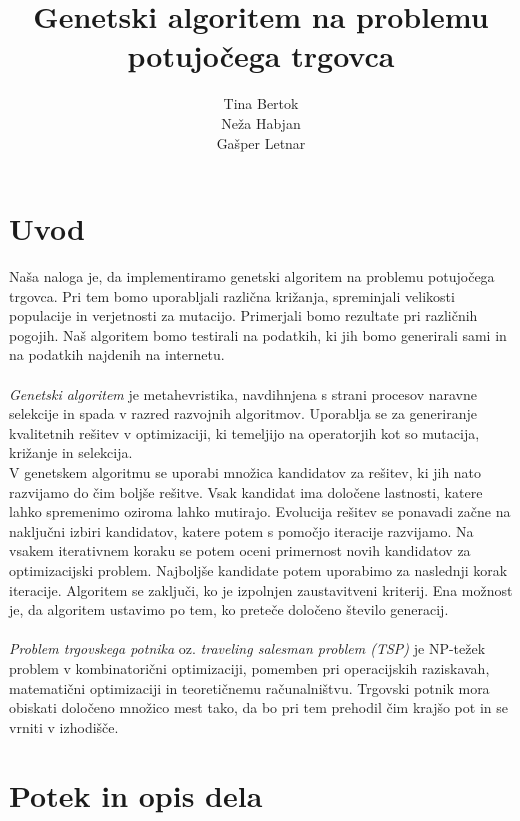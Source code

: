 \documentclass[a4paper]{article}
\title{Genetski algoritem na problemu potujočega trgovca}
\author{Tina Bertok\\ Neža Habjan \\ Gašper Letnar}
\begin{document}
\maketitle
\newpage

\section{Uvod}

Naša naloga je, da implementiramo genetski algoritem na problemu potujočega trgovca. Pri tem bomo uporabljali različna križanja, spreminjali velikosti populacije in verjetnosti za mutacijo. Primerjali bomo rezultate pri različnih pogojih. Naš algoritem bomo testirali na podatkih, ki jih bomo generirali sami in na podatkih najdenih na internetu. 
\\
\\
\textit{Genetski algoritem} je metahevristika, navdihnjena s strani procesov naravne selekcije in spada v razred razvojnih
algoritmov. Uporablja se za generiranje kvalitetnih rešitev v optimizaciji, ki temeljijo na operatorjih kot so mutacija, križanje
in selekcija.  
\\
V genetskem algoritmu se uporabi množica kandidatov za rešitev, ki jih nato razvijamo do čim boljše rešitve. Vsak kandidat
ima določene lastnosti, katere lahko spremenimo oziroma lahko mutirajo. Evolucija rešitev se ponavadi začne na naključni izbiri kandidatov, katere potem s pomočjo iteracije razvijamo. Na vsakem iterativnem koraku se potem oceni primernost novih kandidatov za optimizacijski problem. Najboljše kandidate potem uporabimo za naslednji korak iteracije. Algoritem se zaključi, ko je izpolnjen zaustavitveni kriterij. Ena možnost je, da algoritem ustavimo po tem, ko preteče določeno število generacij.
\\
\\
\textit{Problem trgovskega potnika} oz. \textit{traveling salesman problem (TSP)} je NP-težek problem v kombinatorični optimizaciji, pomemben pri operacijskih raziskavah, matematični optimizaciji in teoretičnemu računalništvu. Trgovski potnik mora obiskati določeno množico mest tako, da bo pri tem prehodil čim krajšo pot in se vrniti v izhodišče.


\newpage
\section{Potek in opis dela}
\end{document}
